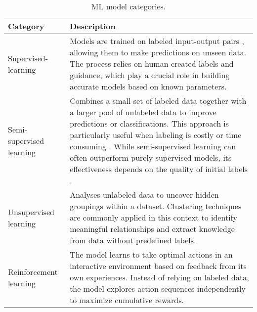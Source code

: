 \begin{table}[htbp]
  \centering
  \begin{tabularx}{\linewidth}{@{}lX@{}}
    \toprule
    \textbf{Category}        & \textbf{Description}                                                                                                                                                                                                                                                                                                                                                      \\
    \midrule
    Supervised-learning      & Models are trained on labeled input-output pairs , allowing them to make predictions on unseen data. The process relies on human created labels and guidance, which play a crucial role in building accurate models based on known parameters.                                                                                                                            \\
    \addlinespace
    Semi-supervised learning & Combines a small set of labeled data together with a larger pool of unlabeled data to improve predictions or classifications. This approach is particularly useful when labeling is costly or time consuming . While semi-supervised learning can often outperform purely supervised models, its effectiveness depends on the quality of initial labels \cite{zhou:2021}. \\
    \addlinespace
    Unsupervised learning    & Analyses unlabeled data to uncover hidden groupings within a dataset. Clustering techniques are commonly applied in this context to identify meaningful relationships and extract knowledge from data without predefined labels.\cite{wu:2022}                                                                                                                            \\
    \addlinespace
    Reinforcement learning   & The model learns to take optimal actions in an interactive environment based on feedback from its own experiences. Instead of relying on labeled data, the model explores action sequences independently to maximize cumulative rewards. \cite{talaeikhoei:2023}                                                                                                          \\
    \bottomrule
  \end{tabularx}
  \caption{ML model categories.}
  \label{tab:ml_model_categories}
\end{table}


